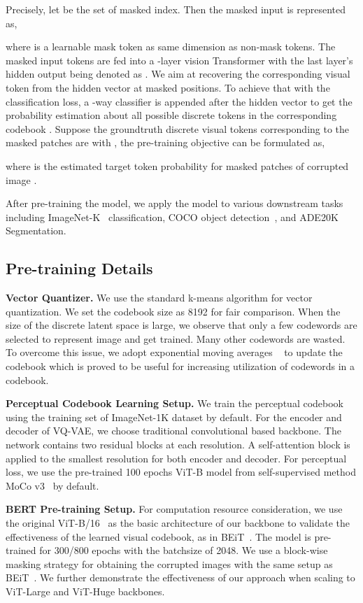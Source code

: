 \documentclass[letterpaper]{article} \usepackage{aaai23}  \usepackage{times}  \usepackage{helvet}  \usepackage{courier}  \usepackage[hyphens]{url}  \usepackage{graphicx} \urlstyle{rm} \def\UrlFont{\rm}  \usepackage{natbib}  \usepackage{caption} \frenchspacing  \setlength{\pdfpagewidth}{8.5in}  \setlength{\pdfpageheight}{11in}  \usepackage{algorithm}
\begin{document}
Precisely, let  be the set of masked index.
Then the masked input  is represented as,

where  is a learnable mask token as same dimension as non-mask tokens.
The masked input tokens are fed into a -layer vision Transformer with the last layer's hidden output being denoted as .
We aim at recovering the corresponding visual token from the hidden vector at masked positions.
To achieve that with the classification loss, 
a -way classifier is appended after the hidden vector  to get the probability estimation about all possible discrete tokens in the corresponding codebook .
Suppose the groundtruth discrete visual tokens corresponding to the masked patches are  with , the pre-training objective can be formulated as,

where  is the estimated target token probability for masked patches of corrupted image .

After pre-training the model, we apply the model to various downstream tasks including ImageNet-K~\cite{deng2009imagenet} classification, COCO object detection~\cite{lin2014microsoftcoco}, and ADE20K~\cite{zhou2017scene} Segmentation.



\subsection{Pre-training Details}
\noindent \textbf{Vector Quantizer.} 
We use the standard k-means algorithm for vector quantization. 
We set the codebook size  as 8192 for fair comparison.
When the size of the discrete latent space  is large, we observe that only a few codewords are selected to represent image and get trained.
Many other codewords are wasted.
To overcome this issue, we adopt exponential moving averages ~\cite{oord2017neural} to update the codebook which is proved to be useful for increasing utilization of codewords in a codebook. 

\noindent \textbf{Perceptual Codebook Learning Setup.} We train the perceptual codebook using the training set of ImageNet-1K dataset by default. For the encoder and decoder of VQ-VAE, we choose traditional convolutional based backbone.
The network contains two residual blocks at each resolution.
A self-attention block is applied to the smallest resolution for both encoder and decoder. 
For perceptual loss, we use the pre-trained 100 epochs ViT-B model from self-supervised method MoCo v3~\cite{chen2021empirical} by default.


\noindent \textbf{BERT Pre-training Setup.} 
For computation resource consideration, we use the original ViT-B/16~\cite{dosovitskiy2020image} as the basic architecture of our backbone to validate the effectiveness of the learned visual codebook, as in BEiT~\cite{bao2021beit}. The model is pre-trained for 300/800 epochs with the batchsize of 2048. 
We use a block-wise masking strategy for obtaining the corrupted images with the same setup as BEiT~\cite{bao2021beit}. 
We further demonstrate the effectiveness of our approach when scaling to ViT-Large and ViT-Huge backbones.
\end{document}
